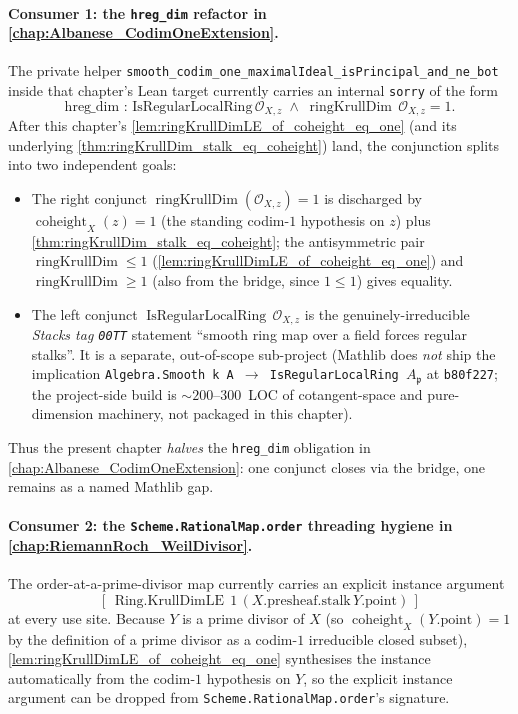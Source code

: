 \paragraph{Consumer 1: the \texttt{hreg\_dim} refactor in
\texorpdfstring{\cref{chap:Albanese_CodimOneExtension}}{the codim-1 extension chapter}.}
The private helper
\texttt{smooth\_codim\_one\_maximalIdeal\_isPrincipal\_and\_ne\_bot}
inside that chapter's Lean target currently carries an internal
\texttt{sorry} of the form
\[
  \text{hreg\_dim : IsRegularLocalRing}\,\mathcal{O}_{X,z}\;\wedge\;
  \operatorname{ringKrullDim}\,\mathcal{O}_{X,z} = 1.
\]
After this chapter's
\cref{lem:ringKrullDimLE_of_coheight_eq_one} (and its underlying
\cref{thm:ringKrullDim_stalk_eq_coheight}) land, the conjunction splits into
two independent goals:
\begin{itemize}
  \item The right conjunct \(\operatorname{ringKrullDim}(\mathcal{O}_{X,z}) = 1\)
    is discharged by
    \(\operatorname{coheight}_{X}(z) = 1\) (the standing codim-\(1\) hypothesis
    on \(z\)) plus \cref{thm:ringKrullDim_stalk_eq_coheight}; the antisymmetric
    pair \(\operatorname{ringKrullDim} \leq 1\) (\cref{lem:ringKrullDimLE_of_coheight_eq_one})
    and \(\operatorname{ringKrullDim} \geq 1\) (also from the bridge, since
    \(1 \leq 1\)) gives equality.
  \item The left conjunct \(\operatorname{IsRegularLocalRing}\,\mathcal{O}_{X,z}\)
    is the genuinely-irreducible \emph{Stacks tag \texttt{00TT}} statement
    ``smooth ring map over a field forces regular stalks''. It is a separate,
    out-of-scope sub-project (Mathlib does \emph{not} ship the implication
    \texttt{Algebra.Smooth k A \(\to\) IsRegularLocalRing \(A_{\mathfrak{p}}\)} at
    \texttt{b80f227}; the project-side build is \(\sim 200\)--\(300\)~LOC of
    cotangent-space and pure-dimension machinery, not packaged in this
    chapter).
\end{itemize}
Thus the present chapter \emph{halves} the \texttt{hreg\_dim} obligation in
\cref{chap:Albanese_CodimOneExtension}: one conjunct closes via the bridge,
one remains as a named Mathlib gap.

\paragraph{Consumer 2: the \texttt{Scheme.RationalMap.order} threading
hygiene in \texorpdfstring{\cref{chap:RiemannRoch_WeilDivisor}}{the Weil-divisor chapter}.}
The order-at-a-prime-divisor map currently carries an explicit instance
argument
\[
  [\,\operatorname{Ring.KrullDimLE}\,1\,(X.\text{presheaf.stalk}\,Y.\text{point})\,]
\]
at every use site. Because \(Y\) is a prime divisor of \(X\) (so
\(\operatorname{coheight}_{X}(Y.\text{point}) = 1\) by the definition of a prime
divisor as a codim-\(1\) irreducible closed subset),
\cref{lem:ringKrullDimLE_of_coheight_eq_one} synthesises the instance
automatically from the codim-\(1\) hypothesis on \(Y\), so the explicit instance
argument can be dropped from \texttt{Scheme.RationalMap.order}'s signature.

